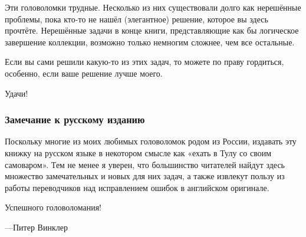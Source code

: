Эти головоломки трудные.
Несколько из них существовали долго как нерешённые проблемы, пока кто-то не нашёл (элегантное) решение, которое вы здесь прочтёте.
Нерешённые задачи в конце книги, представляющие как бы логическое завершение коллекции, возможно только немногим сложнее, чем все остальные.

Если вы сами решили какую-то из этих задач, то можете по праву гордиться, особенно, если ваше решение лучше моего.

Удачи!





\subsubsection*{Замечание к русскому изданию}

Поскольку многие из моих любимых головоломок родом из России, издавать эту книжку на русском языке в некотором смысле как «ехать в Тулу со своим самоваром».
Тем не менее я уверен, что большинство читателей найдут здесь множество замечательных и новых для них задач, а также извлекут пользу из работы переводчиков над исправлением ошибок в английском оригинале.

Успешного головоломания!

\begin{flushright}
---Питер Винклер
\end{flushright}

